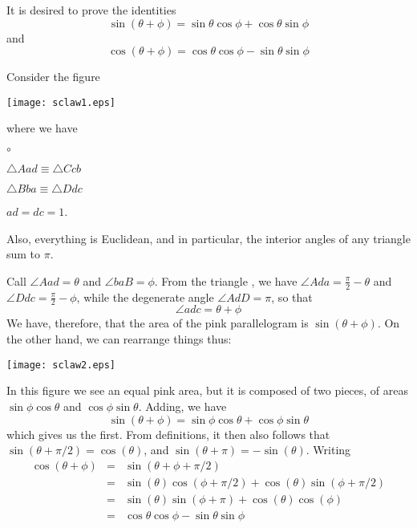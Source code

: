 \documentclass[12pt]{article}
\begin{document}
It is desired to prove the identities
\[ \sin(\theta+\phi) = \sin\theta\cos\phi + \cos\theta\sin\phi \]
and
\[ \cos(\theta+\phi) = \cos\theta\cos\phi - \sin\theta\sin\phi \]

Consider the figure

\begin{center}
\texttt{[image: sclaw1.eps]}
\end{center}

where we have
\begin{list}{$\circ$}{}
\item $\triangle Aad \equiv \triangle Ccb$
\item $\triangle Bba \equiv \triangle Ddc$
\item $ad = dc = 1$.
\end{list}

Also, everything is Euclidean, and in particular, the interior angles of any triangle sum to $\pi$.

Call $\angle Aad = \theta$ and $\angle baB = \phi$.
From the triangle , we have $\angle Ada = \frac{\pi}{2}-\theta$ and $\angle Ddc = \frac{\pi}{2} - \phi$, while the degenerate
angle $\angle AdD = \pi$, so that
\[ \angle adc = \theta + \phi\]
We have, therefore, that the area of the pink parallelogram is $\sin(\theta + \phi)$.  On the other hand, we can rearrange things thus:

\begin{center}
\texttt{[image: sclaw2.eps]}
\end{center}

In this figure we see an equal pink area, but it is composed of two pieces, of areas $\sin \phi \cos\theta$ and $\cos\phi \sin\theta$.  Adding, 
we have 
$$ \sin(\theta + \phi) = \sin\phi\cos\theta + \cos\phi\sin\theta$$
which gives us the first.
From definitions, it then also follows that $\sin(\theta + \pi/2) = \cos(\theta)$, and $\sin(\theta+\pi) = - \sin(\theta)$.
Writing
\[ \begin{array}{rcl}
\cos(\theta + \phi)&=& \sin(\theta+\phi+\pi/2) \\
&=& \sin(\theta)\cos(\phi+\pi/2) + \cos(\theta) \sin(\phi + \pi/2)\\
&=& \sin(\theta)\sin(\phi + \pi) + \cos(\theta) \cos(\phi) \\
&=& \cos\theta\cos\phi - \sin\theta\sin\phi
\end{array} \]
\end{document}
